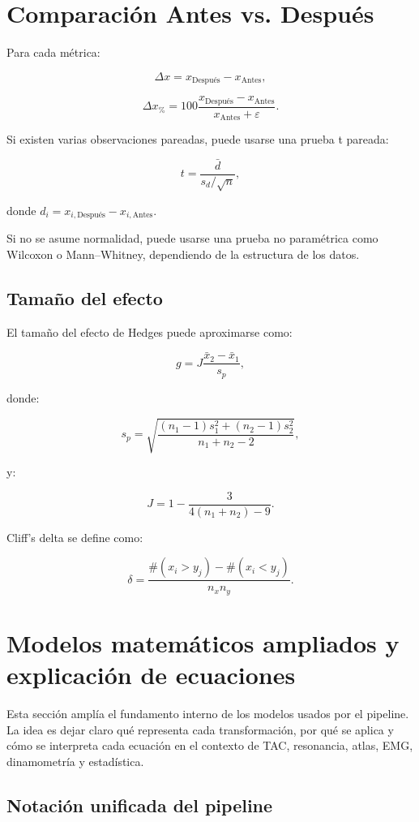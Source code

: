 \documentclass[12pt,a4paper]{article}
\begin{document}
\section{Comparación Antes vs. Después}

Para cada métrica:

\[
\Delta x =
x_{\text{Después}}-x_{\text{Antes}},
\]

\[
\Delta x_{\%}
=
100
\frac{x_{\text{Después}}-x_{\text{Antes}}}
{x_{\text{Antes}}+\varepsilon}.
\]

Si existen varias observaciones pareadas, puede usarse una prueba t pareada:

\[
t =
\frac{\bar{d}}
{s_d/\sqrt{n}},
\]

donde \(d_i=x_{i,\text{Después}}-x_{i,\text{Antes}}\).

Si no se asume normalidad, puede usarse una prueba no paramétrica como Wilcoxon o Mann--Whitney, dependiendo de la estructura de los datos.

\subsection{Tamaño del efecto}

El tamaño del efecto de Hedges puede aproximarse como:

\[
g =
J
\frac{\bar{x}_2-\bar{x}_1}
{s_p},
\]

donde:

\[
s_p =
\sqrt{
\frac{(n_1-1)s_1^2+(n_2-1)s_2^2}
{n_1+n_2-2}
},
\]

y:

\[
J =
1-\frac{3}{4(n_1+n_2)-9}.
\]

Cliff's delta se define como:

\[
\delta =
\frac{
\#(x_i>y_j)-\#(x_i<y_j)
}
{n_x n_y}.
\]


\section{Modelos matemáticos ampliados y explicación de ecuaciones}

Esta sección amplía el fundamento interno de los modelos usados por el pipeline. La idea es dejar claro qué representa cada transformación, por qué se aplica y cómo se interpreta cada ecuación en el contexto de TAC, resonancia, atlas, EMG, dinamometría y estadística.

\subsection{Notación unificada del pipeline}
\end{document}

